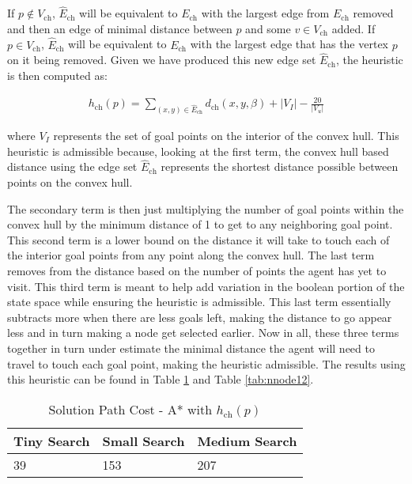 \documentclass{article}[12pt]
\begin{document}
If $p \notin V_{\text{ch}}$, $\hat{E}_{\text{ch}}$ will be equivalent to $E_{\text{ch}}$ with the largest edge from $E_{\text{ch}}$ removed and then an edge of minimal distance between $p$ and some $v \in V_{\text{ch}}$ added. If $p \in V_{\text{ch}}$, $\hat{E}_{\text{ch}}$ will be equivalent to $E_{\text{ch}}$ with the largest edge that has the vertex $p$ on it being removed. Given we have produced this new edge set $\hat{E}_{\text{ch}}$, the heuristic is then computed as:

\begin{align*}
h_{\text{ch}}(p) = \sum_{(x,y) \in \hat{E}_{\text{ch}}} d_{\text{ch}}(x,y, \beta) + |V_I| - \frac{20}{|V_u|}
\end{align*}

where $V_I$ represents the set of goal points on the interior of the convex hull. This heuristic is admissible because, looking at the first term, the convex hull based distance using the edge set $\hat{E}_{\text{ch}}$ represents the shortest distance possible between points on the convex hull. 

The secondary term is then just multiplying the number of goal points within the convex hull by the minimum distance of 1 to get to any neighboring goal point. This second term is a lower bound on the distance it will take to touch each of the interior goal points from any point along the convex hull. The last term removes from the distance based on the number of points the agent has yet to visit. This third term is meant to help add variation in the boolean portion of the state space while ensuring the heuristic is admissible. This last term essentially subtracts more when there are less goals left, making the distance to go appear less and in turn making a node get selected earlier. Now in all, these three terms together in turn under estimate the minimal distance the agent will need to travel to touch each goal point, making the heuristic admissible. The results using this heuristic can be found in Table \ref{tab:sol12} and Table \ref{tab:nnode12}.

\begin{table}[ht]
   \centering
   \begin{tabular}{l | l | l  }
   \hline
    Tiny Search & Small Search & Medium Search\\
    \hline \hline 
   39 & 153 & 207 \\
   \hline
   \end{tabular}
   \caption{Solution Path Cost - A* with $h_{\text{ch}}(p)$} \label{tab:sol12}
   \end{table}
   
\end{document}
